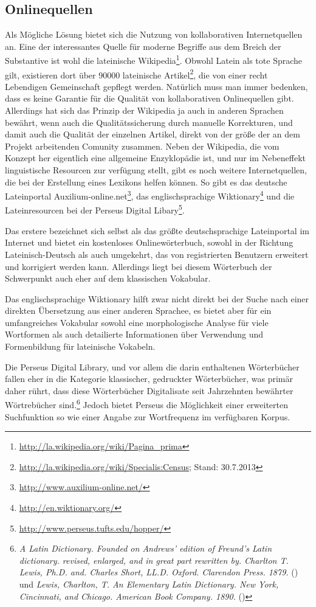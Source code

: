 \documentclass[12pt,abstract=on]{scrreprt}
\begin{document}
\subsection{Onlinequellen}
Als Mögliche Lösung bietet sich die Nutzung von kollaborativen Internetquellen an. Eine der interessantes Quelle für moderne Begriffe aus dem Breich der Substantive ist wohl die lateinische Wikipedia\footnote{\url{http://la.wikipedia.org/wiki/Pagina\_prima}}. Obwohl Latein als tote Sprache gilt, existieren dort über 90000 lateinische Artikel\footnote{\url{http://la.wikipedia.org/wiki/Specialis:Census}; Stand: 30.7.2013}, die von einer recht Lebendigen Gemeinschaft gepflegt werden. Natürlich muss man immer bedenken, dass es keine Garantie für die Qualität von kollaborativen Onlinequellen gibt. Allerdings hat sich das Prinzip der Wikipedia ja auch in anderen Sprachen bewährt, wenn auch die Qualitätssicherung durch manuelle Korrekturen, und damit auch die Qualität der einzelnen Artikel, direkt von der größe der an dem Projekt arbeitenden Comunity zusammen. Neben der Wikipedia, die vom Konzept her eigentlich eine allgemeine Enzyklopädie ist, und nur im Nebeneffekt linguistische Resourcen zur verfügung stellt, gibt es noch weitere Internetquellen, die bei der Erstellung eines Lexikons helfen können. So gibt es das deutsche Lateinportal Auxilium-online.net\footnote{\url{http://www.auxilium-online.net/}}, das englischsprachige Wiktionary\footnote{\url{http://en.wiktionary.org/}} und die Lateinresourcen bei der Perseus Digital Libary\footnote{\url{http://www.perseus.tufts.edu/hopper/}}. \par
Das erstere bezeichnet sich selbst als das größte deutschsprachige Lateinportal im Internet und bietet ein kostenloses Onlinewörterbuch, sowohl in der Richtung Lateinisch-Deutsch als auch umgekehrt, das von registrierten Benutzern erweitert und korrigiert werden kann. Allerdings liegt bei diesem Wörterbuch der Schwerpunkt auch eher auf dem klassischen Vokabular. \par
Das englischsprachige Wiktionary hilft zwar nicht direkt bei der Suche nach einer direkten Übersetzung aus einer anderen Sprachee, es bietet aber für ein umfangreiches Vokabular sowohl eine morphologische Analyse für viele Wortformen als auch detailierte Informationen über Verwendung und Formenbildung für lateinische Vokabeln. \par
Die Perseus Digital Library, und vor allem die darin enthaltenen Wörterbücher fallen eher in die Kategorie klassischer, gedruckter Wörterbücher, was primär daher rührt, dass diese Wörterbücher Digitalisate seit Jahrzehnten bewährter Wörtrebücher sind.\footnote{\textit{A Latin Dictionary. Founded on Andrews' edition of Freund's Latin dictionary. revised, enlarged, and in great part rewritten by. Charlton T. Lewis, Ph.D. and. Charles Short, LL.D. Oxford. Clarendon Press. 1879.} (\persalatin) und \textit{Lewis, Charlton, T. An Elementary Latin Dictionary. New York, Cincinnati, and Chicago. American Book Company. 1890.} (\perselemlat)} Jedoch bietet Perseus die Möglichkeit einer erweiterten Suchfunktion so wie einer Angabe zur Wortfrequenz im verfügbaren Korpus. \par
\end{document}
